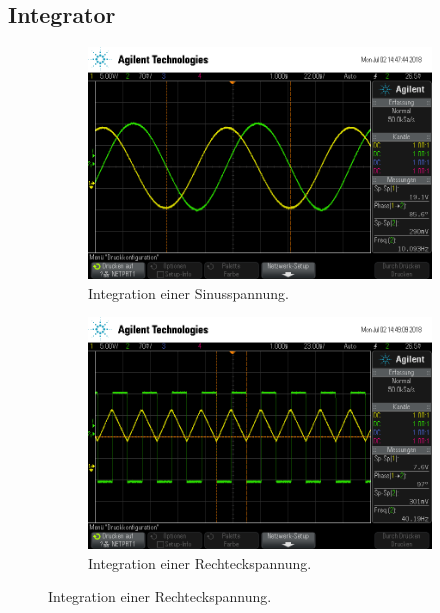 \subsection{Integrator}
\begin{figure}[ht]
  \centering
  
  \caption{}
  \label{fig:}
\end{figure}
\begin{figure}[ht]
  \centering
  \begin{subfigure}[]{\textwidth}
    \centering
    \includegraphics[height=0.3\textheight]{data/scope_262.png}
    \caption{Integration einer Sinusspannung.}
    \label{subfig:int_sinus}
  \end{subfigure}
  \begin{subfigure}[]{\textwidth}
    \centering
    \includegraphics[height=0.3\textheight]{data/scope_263.png}
    \caption{Integration einer Rechteckspannung.}

\end{subfigure}
\end{figure}
